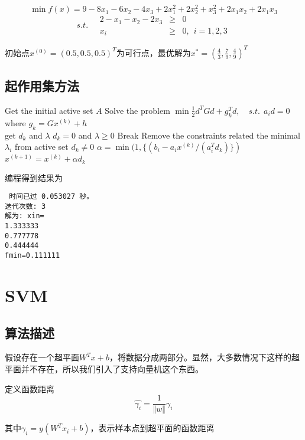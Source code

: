 \documentclass[11pt,a4paper]{article}
\begin{document}
\[\min f(x)=9-8x_1-6x_2-4x_3+2x_1^2+2x_2^2+x_3^2+2x_1x_2+2x_1x_3\]
\[s.t.\quad\begin{array}{rcl}
2-x_1-x_2-2x_3 & \ge & 0\\
x_i & \ge & 0,~~i=1,2,3
\end{array}\]

初始点$x^{(0)}=(0.5,0.5,0.5)^T$为可行点，最优解为$x^*=(\frac{4}{3},\frac{7}{9},\frac{4}{9})^T$

\subsection{起作用集方法}

\begin{codebox}
	\li Get the initial active set $A$
	\li Solve the problem \(\min \frac{1}{2}d^TGd+g_k^Td,\quad s.t.~~a_id=0\)\\
		where $g_k=Gx^{(k)}+h$\\
		get $d_k$ and $\lambda$
	\li \If $d_k=0$ and $\lambda \ge 0$
	\li		\Then	Break
	\li		\Else Remove the constraints related the minimal $\lambda_i$ from active set
	 	\End
	\li \If $d_k\neq 0$
	\li 	\Then $\alpha = \min (1, \{(b_i-a_ix^{(k)}/(a_i^Td_k)\})$
	\li			 $x^{(k+1)}=x^{(k)}+\alpha d_k$
	\li 		{}
		\End
\end{codebox}

编程得到结果为

\noindent\texttt{
	时间已过 0.053027 秒。\\
	迭代次数: 3\\
	解为: xin=\\
	1.333333\\
	0.777778\\
	0.444444\\
	fmin=0.111111
}

\section{SVM}

\subsection{算法描述}

假设存在一个超平面$W^Tx+b$，将数据分成两部分。显然，大多数情况下这样的超平面并不存在，所以我们引入了支持向量机这个东西。

定义函数距离  \[\hat{\gamma_i} =  \frac{1}{\Vert w \Vert}\gamma_i\]

其中$\gamma_i=y(W^Tx_i+b)$，表示样本点到超平面的函数距离
\end{document}
